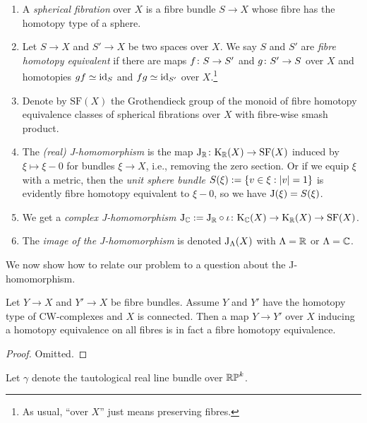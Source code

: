\newcommand{\SF}{\mathrm{SF}}
\begin{definitions}
  \label{J-dfns}
  \begin{enumerate}[leftmargin=*]
  \item A \emph{spherical fibration} over $X$ is a fibre bundle $S \to
    X$ whose fibre has the homotopy type of a sphere.
  \item Let $S \to X$ and $S' \to X$ be two spaces over $X$. We say
    $S$ and $S'$ are \emph{fibre homotopy equivalent} if there are
    maps $f \colon S \to S'$ and $g \colon S' \to S$ over $X$ and homotopies
    $gf \simeq \mathrm{id}_S$ and $fg \simeq \mathrm{id}_{S'}$ over $X$.\footnote{As
      usual, ``over $X$'' just means preserving fibres.}
  \item Denote by $\SF(X)$ the Grothendieck group of the monoid of
    fibre homotopy equivalence classes of spherical fibrations over
    $X$ with fibre-wise smash product.
  \item The \emph{(real) J-homomorphism} is the map $\J_\R \c \K_\R(X)
    \to \SF(X)$ induced by $\xi \mapsto \xi-0$ for bundles $\xi \to
    X$, i.e., removing the zero section. Or if we equip $\xi$ with a
    metric, then the \emph{unit sphere bundle} $S(\xi) \mathrel{:=} \{v \in \xi
    : |v| = 1\}$ is evidently fibre homotopy equivalent to $\xi-0$, so
    we have $\mathrm{J}(\xi) = S(\xi)$.
  \item We get a \emph{complex J-homomorphism} $\J_\C \ce \J_\R \circ
    \iota \c \K_\C(X) \to \K_\R(X) \to \SF(X)$.
  \item The \emph{image of the J-homomorphism} is denoted
    $\mathrm{J}_\Lambda(X)$ with $\Lambda = \mathbb{R}$ or $\Lambda = \mathbb{C}$.
  \end{enumerate}
\end{definitions}

We now show how to relate our problem to a question about the
J-homomorphism.

\begin{lemma}
  \label{dold-fibre}
  Let $Y \to X$ and $Y' \to X$ be fibre bundles. Assume $Y$ and $Y'$
  have the homotopy type of CW-complexes and $X$ is connected. Then a
  map $Y \to Y'$ over $X$ inducing a homotopy equivalence on all
  fibres is in fact a fibre homotopy equivalence.
\end{lemma}

\begin{proof}
  Omitted.
\end{proof}

\begin{notation}
  \label{bundle-notation}
  Let $\gamma$ denote the tautological real line bundle over $\mathbb{RP}^k$.
\end{notation}

